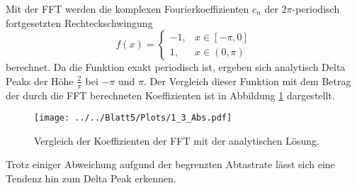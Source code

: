 Mit der FFT werden die komplexen Fourierkoeffizienten $c_n$ der $2\pi$-periodisch fortgesetzten Rechteckschwingung
\begin{equation}
  f(x)=
  \begin{cases}
    -1, & x\in[-\pi,0] \\
    1, & x\in(0,\pi)
  \end{cases}
\end{equation}
berechnet. Da die Funktion exakt periodisch ist, ergeben sich analytisch Delta Peaks der Höhe $\frac{2}{\pi}$ bei $-\pi$ und $\pi$. Der Vergleich dieser Funktion mit dem Betrag der durch die FFT berechneten Koeffizienten ist in Abbildung \ref{fig:plot3}
dargestellt.
\begin{figure}[H]
  \texttt{[image: ../../Blatt5/Plots/1\_3\_Abs.pdf]}
  \caption{Vergleich der Koeffizienten der FFT mit der analytischen Lösung.}
  \label{fig:plot3}
\end{figure}
Trotz einiger Abweichung aufgund der begrenzten Abtastrate lässt sich eine Tendenz hin zum Delta Peak erkennen.
